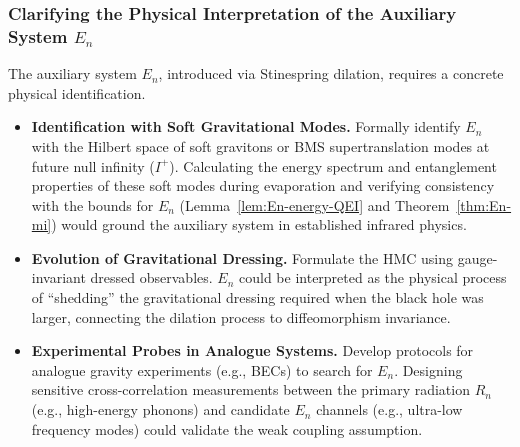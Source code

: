 \documentclass[11pt,a4paper]{article}
\providecommand{\texorpdfstring}[2]{#1}
\newcommand{\Iplus}{I^{+}}
\theoremstyle{plain}
\theoremstyle{definition}
\theoremstyle{remark}
\begin{document}
\subsubsection{Clarifying the Physical Interpretation of the Auxiliary System \texorpdfstring{$E_n$}{En}}
The auxiliary system $E_n$, introduced via Stinespring dilation, requires a concrete physical identification.
\begin{itemize}
    \item \textbf{Identification with Soft Gravitational Modes.} Formally identify $E_n$ with the Hilbert space of soft gravitons or BMS supertranslation modes at future null infinity ($\Iplus$). Calculating the energy spectrum and entanglement properties of these soft modes during evaporation and verifying consistency with the bounds for $E_n$ (Lemma~\ref{lem:En-energy-QEI} and Theorem~\ref{thm:En-mi}) would ground the auxiliary system in established infrared physics.
    \item \textbf{Evolution of Gravitational Dressing.} Formulate the HMC using gauge-invariant dressed observables. $E_n$ could be interpreted as the physical process of ``shedding'' the gravitational dressing required when the black hole was larger, connecting the dilation process to diffeomorphism invariance.
    \item \textbf{Experimental Probes in Analogue Systems.} Develop protocols for analogue gravity experiments (e.g., BECs) to search for $E_n$. Designing sensitive cross-correlation measurements between the primary radiation $R_n$ (e.g., high-energy phonons) and candidate $E_n$ channels (e.g., ultra-low frequency modes) could validate the weak coupling assumption.
\end{itemize}
\end{document}
